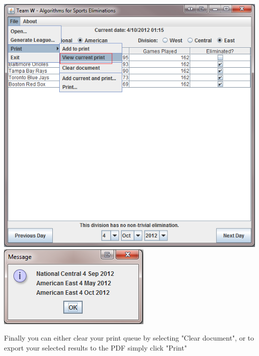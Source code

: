 \includegraphics[width=\linewidth,keepaspectratio]{images/userManualDesk11.png}
\includegraphics[width=\linewidth,keepaspectratio]{images/userManualDesk12.png}

Finally you can either clear your print queue by selecting "Clear document", or to export your selected results to the PDF simply click "Print"

